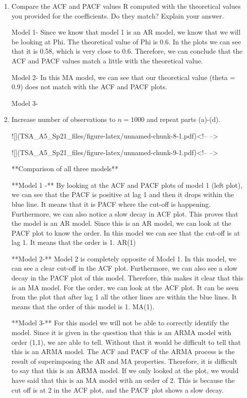 \documentclass[
]{article}
\begin{document}
\begin{enumerate}[label=(\alph*)]
\item Compare the ACF and PACF values R computed with the theoretical values you provided for the coefficients. Do they match? Explain your answer.

Model 1- Since we know that model 1 is an AR model, we know that we will be looking at Phi. The theoretical value of Phi is 0.6. In the plots we can see that it is 0.58, which is very close to 0.6. Therefore, we can conclude that the ACF and PACF values match a little with the theoretical value.

Model 2- In this MA model, we can see that our theoretical value (theta = 0.9) does not match with the ACF and PACF plots.

Model 3- 


\item Increase number of observations to $n=1000$ and repeat parts (a)-(d).



![](TSA_A5_Sp21_files/figure-latex/unnamed-chunk-8-1.pdf)<!-- --> 

![](TSA_A5_Sp21_files/figure-latex/unnamed-chunk-9-1.pdf)<!-- --> 

\medskip

**Comparison of all three models**

**Model 1 -** By looking at the ACF and PACF plots of model 1 (left plot), we can see that the PACF is positive at lag 1 and then it drops within the blue line. It means that it is PACF where the cut-off is happening. Furthermore, we can also notice a slow decay in ACF plot. This proves that the model is an AR model. Since this is an AR model, we can look at the PACF plot to know the order. In this model we can see that the cut-off is at lag 1. It means that the order is 1. AR(1)

**Model 2-** Model 2 is completely opposite of Model 1. In this model, we can see a clear cut-off in the ACF plot. Furthermore, we can also see a slow decay in the PACF plot of this model. Therefore, this makes it clear that this is an MA model. For the order, we can look at the ACF plot. It can be seen from the plot that after lag 1 all the other lines are within the blue lines. It means that the order of this model is 1. MA(1).

**Model 3-** For this model we will not be able to correctly identify the model. Since it is given in the question that this is an ARMA model with order (1,1), we are able to tell. Without that it would be difficult to tell that this is an ARMA model. The ACF and PACF of the ARMA process is the result of superimposing the AR and MA properties. Therefore, it is difficult to say that this is an ARMA model. If we only looked at the plot, we would have said that this is an MA model with an order of 2. This is because the cut off is at 2 in the ACF plot, and the PACF plot shows a slow decay.



\end{enumerate}
\end{document}
